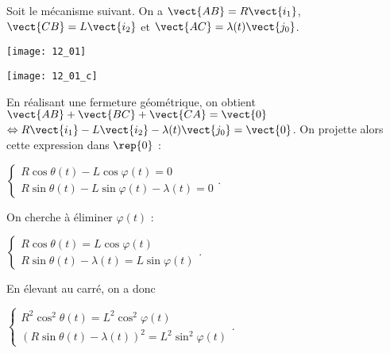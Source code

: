 \normaltrue \difficilefalse \tdifficilefalse
\correctiontrue


\setcounter{question}{0}%
\ifcorrection
\else
{}
\fi

\ifprof
\else
Soit le mécanisme suivant. On a $\vect{AB}=R\vect{i_1}$, $\vect{CB}=L\vect{i_2}$ et $\vect{AC}=\lambda(t) \vect{j_0}$. 

\begin{marginfigure}
\texttt{[image: 12\_01]}
\end{marginfigure}
\fi


\ifprof
\begin{marginfigure}
\texttt{[image: 12\_01\_c]}
\end{marginfigure}
\else
\fi


\ifprof
En réalisant une fermeture géométrique, on obtient 
$\vect{AB}+\vect{BC}+\vect{CA}=\vect{0}$ 
$ \Leftrightarrow R\vect{i_1} - L\vect{i_2} - \lambda(t) \vect{j_0} = \vect{0}$.
On projette alors cette expression dans $\rep{0}$ : 

$
\left\{
\begin{array}{l}
R\cos\theta(t)- L\cos\varphi(t) = 0 \\
R\sin\theta(t) - L\sin\varphi(t) - \lambda(t) = 0 
\end{array}
\right.
$.

On cherche à éliminer $\varphi(t)$ : 

$
\left\{
\begin{array}{l}
R\cos\theta(t) = L\cos\varphi(t)  \\
R\sin\theta(t)  - \lambda(t) = L\sin\varphi(t)
\end{array}
\right.
$.

En élevant au carré, on a donc 

$\left\{
\begin{array}{l}
R^2\cos^2\theta(t) = L^2\cos^2\varphi(t)  \\
\left(R\sin\theta(t)  - \lambda(t)\right)^2 = L^2\sin^2\varphi(t)
\end{array}
\right.
$.

